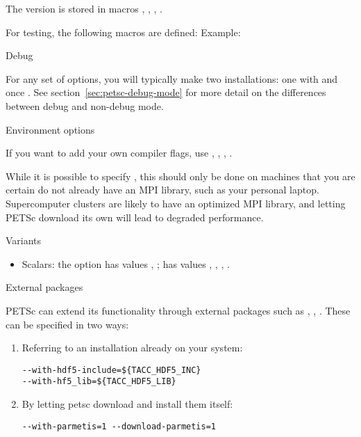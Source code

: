 The version is stored in macros
,
,
,
.

For testing, the following macros are defined:
Example:

 {Debug}

For any set of options, you will typically make two installations:
one with  and once .
See section~\ref{sec:petsc-debug-mode} for more detail
on the differences between debug and non-debug mode.

 {Environment options}

If you want to add your own compiler flags, use
,
,
,
.

While it is possible to specify ,
this should only be done on machines that you are certain do not
already have an MPI library, such as your personal
laptop. Supercomputer clusters are likely to have an optimized MPI
library, and letting PETSc download its own will lead to degraded
performance.

 {Variants}

\begin{itemize}
\item Scalars: the option  has values
  , ;  has values
  , , , .
\end{itemize}

 {External packages}
\label{sec:petsc-external}

PETSc can extend its functionality through external packages such as
, , . These can be
specified in two ways:
\begin{enumerate}
\item Referring to an installation already on your system:
\begin{verbatim}
--with-hdf5-include=${TACC_HDF5_INC}
--with-hf5_lib=${TACC_HDF5_LIB}
\end{verbatim}
\item By letting petsc download and install them itself:
\begin{verbatim}
--with-parmetis=1 --download-parmetis=1
\end{verbatim}
\end{enumerate}

